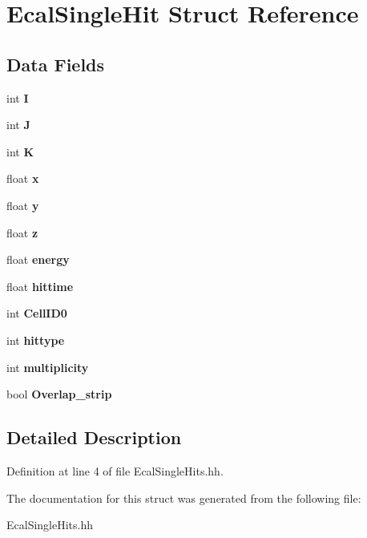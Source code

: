 \section{Ecal\-Single\-Hit Struct Reference}
\label{structEcalSingleHit}
\subsection*{Data Fields}
\begin{DoxyCompactItemize}
\item 
int {\bfseries I}\label{structEcalSingleHit_ae578cbaa0ea7c69d07c7ee4a3494b0a4}

\item 
int {\bfseries J}\label{structEcalSingleHit_added1324c391c5f65b64ff5101d57815}

\item 
int {\bfseries K}\label{structEcalSingleHit_a2b41adbb1a1951082a576e2946f2c565}

\item 
float {\bfseries x}\label{structEcalSingleHit_acbe99a6c25dbafe6c183a502d27d06fe}

\item 
float {\bfseries y}\label{structEcalSingleHit_a21bc45b5f6b8cc1d304ff8690458054c}

\item 
float {\bfseries z}\label{structEcalSingleHit_a544ae1aa36f404766d44346ba6e17bd1}

\item 
float {\bfseries energy}\label{structEcalSingleHit_abea53cadbe2e6705c61d1b31663ed6b2}

\item 
float {\bfseries hittime}\label{structEcalSingleHit_a2496240ba297d34250884676064574a2}

\item 
int {\bfseries Cell\-I\-D0}\label{structEcalSingleHit_af397ceaef3933f6572e90350a61728dd}

\item 
int {\bfseries hittype}\label{structEcalSingleHit_aec28d77ea72749051db6ddd4927aac1b}

\item 
int {\bfseries multiplicity}\label{structEcalSingleHit_a2d5b2b52900d835faed187a86c728bbe}

\item 
bool {\bfseries Overlap\-\_\-strip}\label{structEcalSingleHit_a3c05251f3b4ef3f1969de0c37de78aef}

\end{DoxyCompactItemize}


\subsection{Detailed Description}


Definition at line 4 of file Ecal\-Single\-Hits.\-hh.



The documentation for this struct was generated from the following file\-:\begin{DoxyCompactItemize}
\item 
Ecal\-Single\-Hits.\-hh\end{DoxyCompactItemize}
